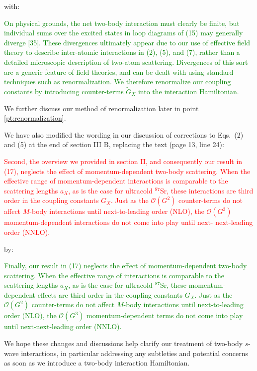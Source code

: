 \documentclass[preprint]{revtex4-1}
\newcommand{\p}[1]{\left(#1\right)} %
\renewcommand{\O}{\mathcal{O}}
\newcommand{\1}{\mathds{1}}
\newcommand{\red}[1]{\textcolor{red}{#1}}
\newcommand{\green}[1]{\textcolor{green}{#1}}
\begin{document}
\begin{enumerate}
  with:

  \green{On physical grounds, the net two-body interaction must
    clearly be finite, but individual sums over the excited states in
    loop diagrams of (15) may generally diverge [35].  These
    divergences ultimately appear due to our use of effective field
    theory to describe inter-atomic interactions in (2), (5), and (7),
    rather than a detailed microscopic description of two-atom
    scattering.  Divergences of this sort are a generic feature of
    field theories, and can be dealt with using standard techniques
    such as renormalization.  We therefore renormalize our coupling
    constants by introducing counter-terms $\tilde G_X$ into the
    interaction Hamiltonian.}

  We further discuss our method of renormalization later in point
  \ref{pt:renormalization}.

  We have also modified the wording in our discussion of corrections
  to Eqs.~(2) and (5) at the end of section III B, replacing the text
  (page 13, line 24):

  \red{Second, the overview we provided in section II, and
    consequently our result in (17), neglects the effect of
    momentum-dependent two-body scattering. When the effective range
    of momentum-dependent interactions is comparable to the scattering
    lengths $a_X$, as is the case for ultracold ${}^{87}$Sr, these
    interactions are third order in the coupling constants $G_X$. Just
    as the $\O\p{G^2}$ counter-terms do not affect $M$-body
    interactions until next-to-leading order (NLO), the $\O\p{G^3}$
    momentum-dependent interactions do not come into play until next-
    next-leading order (NNLO).}

  by:

  \green{Finally, our result in (17) neglects the effect of
    momentum-dependent two-body scattering.  When the effective range
    of interactions is comparable to the scattering lengths $a_X$, as
    is the case for ultracold ${}^{87}$Sr, these momentum-dependent
    effects are third order in the coupling constants $G_X$.  Just as
    the $\O\p{G^2}$ counter-terms do not affect $M$-body interactions
    until next-to-leading order (NLO), the $\O\p{G^3}$
    momentum-dependent terms do not come into play until
    next-next-leading order (NNLO).}

  We hope these changes and discussions help clarify our treatment of
  two-body $s$-wave interactions, in particular addressing any
  subtleties and potential concerns as soon as we introduce a two-body
  interaction Hamiltonian.



\end{enumerate}
\end{document}
